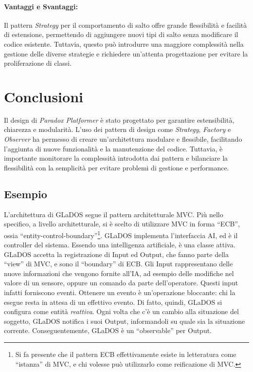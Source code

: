 \documentclass[a4paper,12pt]{report}
\begin{document}
\paragraph{Vantaggi e Svantaggi:} 
Il pattern \textit{Strategy} per il comportamento di salto offre grande flessibilità e facilità di estensione, permettendo di aggiungere nuovi tipi di salto senza modificare il codice esistente. Tuttavia, questo può introdurre una maggiore complessità nella gestione delle diverse strategie e richiedere un'attenta progettazione per evitare la proliferazione di classi.

\section{Conclusioni}

Il design di \textit{Paradox Platformer} è stato progettato per garantire estensibilità, chiarezza e modularità. L'uso dei pattern di design come \textit{Strategy}, \textit{Factory} e \textit{Observer} ha permesso di creare un'architettura modulare e flessibile, facilitando l'aggiunta di nuove funzionalità e la manutenzione del codice. Tuttavia, è importante monitorare la complessità introdotta dai pattern e bilanciare la flessibilità con la semplicità per evitare problemi di gestione e performance.



\subsection*{Esempio}

L'architettura di GLaDOS segue il pattern architetturale MVC.
%
Più nello specifico, a livello architetturale, si è scelto di utilizzare MVC in forma ``ECB'', ossia ``entity-control-boundary''\footnote{
Si fa presente che il pattern ECB effettivamente esiste in letteratura come ``istanza'' di MVC, e chi volesse può utilizzarlo come reificazione di MVC.
}.
%
GLaDOS implementa l'interfaccia AI, ed è il controller del sistema.
Essendo una intelligenza artificiale, è una classe attiva.
%
GLaDOS accetta la registrazione di Input ed Output, che fanno parte della ``view'' di MVC, e sono il ``boundary'' di ECB.
Gli Input rappresentano delle nuove informazioni che vengono fornite all'IA, ad esempio delle modifiche nel valore di un sensore, oppure un comando da parte dell'operatore.
Questi input infatti forniscono eventi.
Ottenere un evento è un'operazione bloccante: chi la esegue resta in attesa di un effettivo evento.
Di fatto, quindi, GLaDOS si configura come entità \textit{reattiva}.
Ogni volta che c'è un cambio alla situazione del soggetto, GLaDOS notifica i suoi Output,
informandoli su quale sia la situazione corrente.
%
Conseguentemente, GLaDOS è un ``observable'' per Output.
\end{document}
